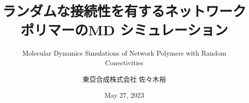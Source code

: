 \title{ランダムな接続性を有するネットワークポリマーのMD シミュレーション}
\subtitle{Molecular Dynamics Simulations of Network Polymers with Random Conectivities}
\author{東亞合成株式会社 佐々木裕}
\date{May 27, 2023}

\newcommand{\gakkai}{OCTA20周年記念講演会@名古屋大学}